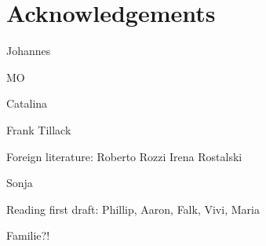 \section*{Acknowledgements}

Johannes

MO

Catalina

Frank Tillack


Foreign literature: 
Roberto Rozzi
Irena Rostalski


Sonja

Reading first draft: Phillip, Aaron, Falk, Vivi, Maria

Familie?!